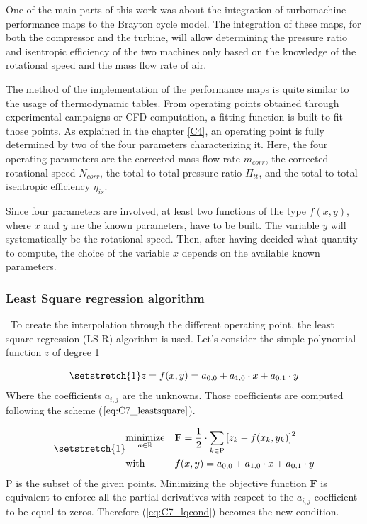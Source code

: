 One of the main parts of this work was about the integration of turbomachine performance maps to the Brayton cycle model. The integration of these maps, for both the compressor and the turbine, will allow determining the pressure ratio and isentropic efficiency of the two machines only based on the knowledge of the rotational speed and the mass flow rate of air.

The method of the implementation of the performance maps is quite similar to the usage of thermodynamic tables. From operating points obtained through experimental campaigns or CFD computation, a fitting function is built to fit those points. As explained in the chapter \ref{C4}, an operating point is fully determined by two of the four parameters characterizing it. Here, the four operating parameters are the corrected mass flow rate $m_{corr}$, the corrected rotational speed $N_{corr}$, the total to total pressure ratio $\Pi_{tt}$, and the total to total isentropic efficiency $\eta_{is}$. 

Since four parameters are involved, at least two functions of the type $f(x,y)$, where $x$ and $y$ are the known parameters, have to be built. The variable $y$ will systematically be the rotational speed. Then, after having decided what quantity to compute, the choice of the variable $x$ depends on the available known parameters.

\subsubsection{Least Square regression algorithm}
\quad\ To create the interpolation through the different operating point, the least square regression (LS-R) algorithm is used. Let's consider the simple polynomial function $z$ of degree 1

\begin{equation*}
    \setstretch{1}
    z = f(x,y) = a_{0,0} + a_{1,0}\cdot x + a_{0,1}\cdot y
\end{equation*}
Where the coefficients $a_{i,j}$ are the unknowns. Those coefficients are computed following the scheme ($\ref{eq:C7_leastsquare}$). 

\begin{equation}
\setstretch{1}
\begin{aligned}
& \underset{a\in\mathbb{R}}{\text{minimize}}
& &  \textbf{F} = \frac{1}{2}\cdot\sum_{k\in\textsc{P}}\left[z_k - f(x_k, y_k) \right]^2 \\
& \text{with}
& & f(x, y) = a_{0,0} + a_{1,0}\cdot x + a_{0,1}\cdot y
\end{aligned}\label{eq:C7_leastsquare}
\end{equation}
\textsc{P} is the subset of the given points. Minimizing the objective function $\textbf{F}$ is equivalent to enforce all the partial derivatives with respect to the $a_{i,j}$ coefficient to be equal to zeros. Therefore (\ref{eq:C7_lqcond}) becomes the new condition.

